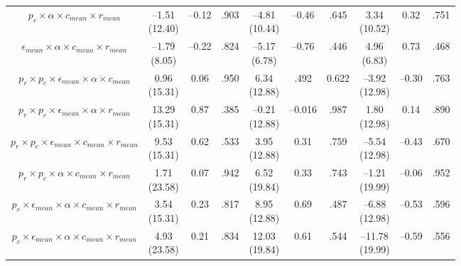 \documentclass[
  11pt,
]{article}
\begin{document}
\begin{landscape}
\begin{ThreePartTable}
\begin{longtable}[t]{cccccccccc}
\addlinespace
$p_r \times \alpha \times c_{mean} \times r_{mean}$ & \makecell[c]{–1.51\\(12.40)} & –0.12 & .903 & \makecell[c]{–4.81\\(10.44)} & –0.46 & .645 & \makecell[c]{3.34\\(10.52)} & 0.32 & .751\\
$\epsilon_{mean} \times \alpha \times c_{mean} \times r_{mean}$ & \makecell[c]{ –1.79\\(8.05)} & –0.22 & .824 & \makecell[c]{–5.17\\(6.78)} & –0.76 & .446 & \makecell[c]{4.96\\(6.83)} & 0.73 & .468\\
$p_r \times p_c \times \epsilon_{mean} \times \alpha \times c_{mean}$ & \makecell[c]{0.96\\(15.31)} & 0.06 & .950 & \makecell[c]{6.34\\(12.88)} & .492 & 0.622 & \makecell[c]{–3.92\\(12.98)} & –0.30 & .763\\
$p_r \times p_c \times \epsilon_{mean} \times \alpha \times r_{mean}$ & \makecell[c]{13.29\\(15.31)} & 0.87 & .385 & \makecell[c]{–0.21\\(12.88)} & –0.016 & .987 & \makecell[c]{1.80\\(12.98)} & 0.14 & .890\\
$p_r \times p_c \times \epsilon_{mean} \times c_{mean} \times r_{mean}$ & \makecell[c]{9.53\\(15.31)} & 0.62 & .533 & \makecell[c]{3.95\\(12.88)} & 0.31 & .759 & \makecell[c]{–5.54\\(12.98)} & –0.43 & .670\\
\addlinespace
$p_r \times p_c \times \alpha \times c_{mean} \times r_{mean}$ & \makecell[c]{1.71\\(23.58)} & 0.07 & .942 & \makecell[c]{6.52\\(19.84)} & 0.33 & .743 & \makecell[c]{–1.21\\(19.99)} & –0.06 & .952\\
$p_r \times \epsilon_{mean} \times \alpha \times c_{mean} \times r_{mean}$ & \makecell[c]{3.54\\(15.31)} & 0.23 & .817 & \makecell[c]{8.95\\(12.88)} & 0.69 & .487 & \makecell[c]{–6.88\\(12.98)} & –0.53 & .596\\
$p_c \times \epsilon_{mean} \times \alpha \times c_{mean} \times r_{mean}$ & \makecell[c]{4.93\\(23.58)} & 0.21 & .834 & \makecell[c]{12.03\\(19.84)} & 0.61 & .544 & \makecell[c]{–11.78\\(19.99)} & –0.59 & .556\\

\end{longtable}
\end{ThreePartTable}
\end{landscape}
\end{document}
